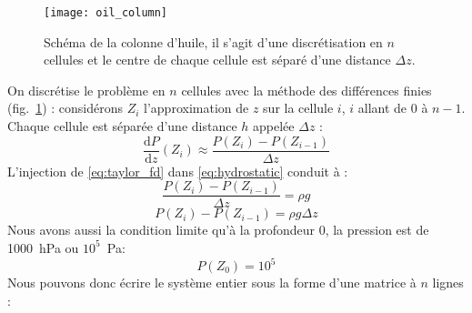 \begin{figure}[!ht]
  \centering
  \texttt{[image: oil\_column]}
  \caption{Schéma de la colonne d'huile, il s'agit d'une discrétisation en $n$ cellules et le centre de chaque cellule est séparé d'une distance $\Delta{z}$.}
  \label{fig:oil_schema}
\end{figure}
%
On discrétise le problème en $n$ cellules avec la méthode des différences finies (fig.~\ref{fig:oil_schema}) : considérons $Z_i$ l'approximation de $z$ sur la cellule $i$, $i$ allant de $0$ à $n-1$.
%
Chaque cellule est séparée d'une distance $h$ appelée $\Delta{z}$ :
%
\begin{equation}
\label{eq:taylor_fd}
\frac{\mathrm d P}{\mathrm d z}(Z_i) \approx \frac{P(Z_{i}) - P(Z_{i-1})}{\Delta{z}}
\end{equation}
%
L'injection de \eqref{eq:taylor_fd} dans \eqref{eq:hydrostatic} conduit à :
%
\begin{equation}
\frac{P(Z_{i}) - P(Z_{i-1})}{\Delta{z}} = \rho{}g
\end{equation}
\begin{equation}
\label{eq:system_pressure}
P(Z_{i}) - P(Z_{i-1}) = \rho{}g\Delta{z}
\end{equation}
Nous avons aussi la condition limite qu'à la profondeur 0, la pression est de 1000~hPa ou $10^5$~Pa:
%
\begin{equation}
P(Z_0) = 10^5
\end{equation}
%
Nous pouvons donc écrire le système entier sous la forme d'une matrice à $n$ lignes :
%
